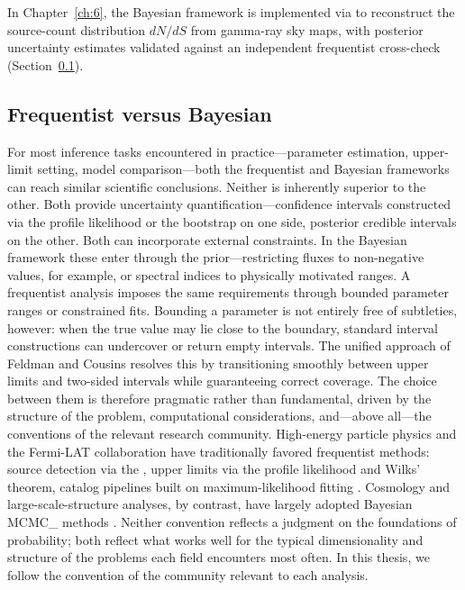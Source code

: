 In Chapter~\ref{ch:6}, the Bayesian framework is implemented via \SBI to reconstruct the source-count distribution $dN/dS$ from gamma-ray sky maps, with posterior uncertainty estimates validated against an independent frequentist cross-check (Section~\ref{sec:3.1.4}).


\subsection{Frequentist versus Bayesian}
\label{sec:3.1.4}

For most inference tasks encountered in practice---parameter estimation, upper-limit setting, model comparison---both the frequentist and Bayesian frameworks can reach similar scientific conclusions.
Neither is inherently superior to the other.
Both provide uncertainty quantification---confidence intervals constructed via the profile likelihood or the bootstrap on one side, posterior credible intervals on the other.
Both can incorporate external constraints.
In the Bayesian framework these enter through the prior---restricting fluxes to non-negative values, for example, or spectral indices to physically motivated ranges.
A frequentist analysis imposes the same requirements through bounded parameter ranges or constrained fits.
Bounding a parameter is not entirely free of subtleties, however: when the true value may lie close to the boundary, standard interval constructions can undercover or return empty intervals.
The unified approach of Feldman and Cousins \cite{Feldman:1997qc} resolves this by transitioning smoothly between upper limits and two-sided intervals while guaranteeing correct coverage.
The choice between them is therefore pragmatic rather than fundamental, driven by the structure of the problem, computational considerations, and---above all---the conventions of the relevant research community.
High-energy particle physics and the Fermi-LAT collaboration have traditionally favored frequentist methods: source detection via the \TS, upper limits via the profile likelihood and Wilks' theorem, catalog pipelines built on maximum-likelihood fitting \cite{Mattox:1996zz}.
Cosmology and large-scale-structure analyses, by contrast, have largely adopted Bayesian \gls{MCMC_} methods \cite{Trotta:2008qt}.
Neither convention reflects a judgment on the foundations of probability; both reflect what works well for the typical dimensionality and structure of the problems each field encounters most often.
In this thesis, we follow the convention of the community relevant to each analysis.

